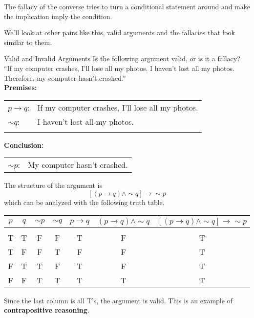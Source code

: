 The fallacy of the converse tries to turn a conditional statement around and make the implication imply the condition.

We'll look at other pairs like this, valid arguments and the fallacies that look similar to them.
\vfill
\pagebreak

\begin{example}[https://www.youtube.com/watch?v=UTm75PK8uSs]{Valid and Invalid Arguments}
Is the following argument valid, or is it a fallacy?\\

``If my computer crashes, I'll lose all my photos.  I haven't lost all my photos.  Therefore, my computer hasn't crashed.''\\

\textbf{Premises:}\\
\begin{tabular}{l l}
$p \to q$: & If my computer crashes, I'll lose all my photos.\\
$\sim q$: & I haven't lost all my photos.\\
& \\
\end{tabular}

\textbf{Conclusion:}\\
\begin{tabular}{l l}
$\sim p$: & My computer hasn't crashed.
\end{tabular}

The structure of the argument is \[[(p \to q) \wedge \sim q] \to \sim p\]
which can be analyzed with the following truth table.
\begin{center}
\begin{tabular}{|c c c c c c c|}
\hline
$p$ & $q$ & $\sim p$ & $\sim q$ & $p \to q$ & $(p \to q) \wedge \sim q$ & $[(p \to q) \wedge \sim q] \to \sim p$\\
\hline
& & & & & & \\
T & T & F & F & T & F & T\\
T & F & F & T & F & F & T\\
F & T & T & F & T & F & T\\
F & F & T & T & T & T & T\\
\hline
\end{tabular}
\end{center}

Since the last column is all T's, the argument is valid.  This is an example of \textbf{contrapositive reasoning}.
\end{example}

